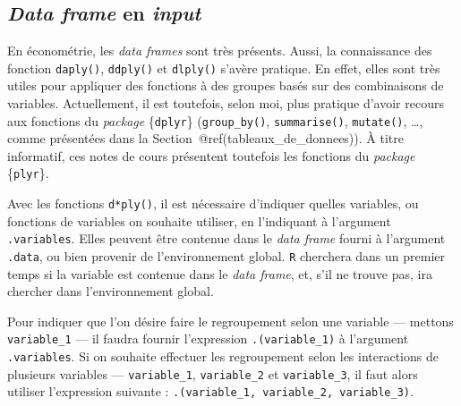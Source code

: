 \documentclass[
  11pt,
]{book}
\numberwithin{equation}{section}
\numberwithin{countremarque}{section}
\begin{document}
\hypertarget{boucles_vectorisation_plyr_d_ply}{%
\subsection{\texorpdfstring{\emph{Data frame} en \emph{input}}{Data frame en input}}\label{boucles_vectorisation_plyr_d_ply}}

En économétrie, les \emph{data frames} sont très présents. Aussi, la connaissance des fonction \texttt{daply()}, \texttt{ddply()} et \texttt{dlply()} s'avère pratique. En effet, elles sont très utiles pour appliquer des fonctions à des groupes basés sur des combinaisons de variables. Actuellement, il est toutefois, selon moi, plus pratique d'avoir recours aux fonctions du \emph{package} \{\texttt{dplyr}\} (\texttt{group\_by()}, \texttt{summarise()}, \texttt{mutate()}, \ldots, comme présentées dans la Section~@ref(tableaux\_de\_donnees)). À titre informatif, ces notes de cours présentent toutefois les fonctions du \emph{package} \{\texttt{plyr}\}.

Avec les fonctions \texttt{d*ply()}, il est nécessaire d'indiquer quelles variables, ou fonctions de variables on souhaite utiliser, en l'indiquant à l'argument \texttt{.variables}. Elles peuvent être contenue dans le \emph{data frame} fourni à l'argument \texttt{.data}, ou bien provenir de l'environnement global. \texttt{R} cherchera dans un premier temps si la variable est contenue dans le \emph{data frame}, et, s'il ne trouve pas, ira chercher dans l'environnement global.

Pour indiquer que l'on désire faire le regroupement selon une variable --- mettons \texttt{variable\_1} --- il faudra fournir l'expression \texttt{.(variable\_1)} à l'argument \texttt{.variables}. Si on souhaite effectuer les regroupement selon les interactions de plusieurs variables --- \texttt{variable\_1}, \texttt{variable\_2} et \texttt{variable\_3}, il faut alors utiliser l'expression suivante : \texttt{.(variable\_1,\ variable\_2,\ variable\_3)}.
\end{document}
